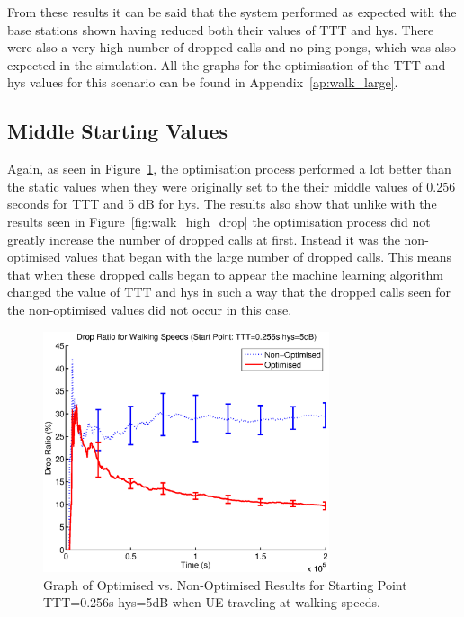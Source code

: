 From these results it can be said that the system performed as expected with the base stations shown having reduced both their values of TTT and hys. There were also a very high number of dropped calls and no ping-pongs, which was also expected in the simulation. All the graphs for the optimisation of the TTT and hys values for this scenario can be found in Appendix~\ref{ap:walk_large}.
\subsection{Middle Starting Values}
Again, as seen in Figure~\ref{fig:walk_mid_drop}, the optimisation process performed a lot better than the static values when they were originally set to the their middle values of 0.256 seconds for TTT and 5 dB for hys. The results also show that unlike with the results seen in Figure~\ref{fig:walk_high_drop} the optimisation process did not greatly increase the number of dropped calls at first. Instead it was the non-optimised values that began with the large number of dropped calls. This means that when these dropped calls began to appear the machine learning algorithm changed the value of TTT and hys in such a way that the dropped calls seen for the non-optimised values did not occur in this case.
\begin{figure}[H]
  \begin{center}
    	  \includegraphics[width=0.75\textwidth]{figures/walking_figures/walkmid.eps}
    \end{center}
    \caption{Graph of Optimised vs. Non-Optimised Results for Starting Point TTT=0.256s hys=5dB when UE traveling at walking speeds.}
    \label{fig:walk_mid_drop}
\end{figure}
